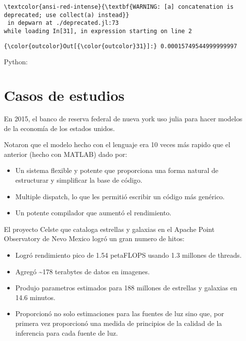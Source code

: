 \documentclass[11pt]{article}
\begin{document}
    \begin{Verbatim}[commandchars=\\\{\}]
\textcolor{ansi-red-intense}{\textbf{WARNING: [a] concatenation is deprecated; use collect(a) instead}}
 in depwarn at ./deprecated.jl:73
while loading In[31], in expression starting on line 2

    \end{Verbatim}

\begin{Verbatim}[commandchars=\\\{\}]
{\color{outcolor}Out[{\color{outcolor}31}]:} 0.00015749544999999997
\end{Verbatim}
            
    Python:

    \section{Casos de estudios}\label{casos-de-estudios}

    En 2015, el banco de reserva federal de nueva york uso julia para hacer
modelos de la economía de los estados unidos.

Notaron que el modelo hecho con el lenguaje era 10 veces más rapido que
el anterior (hecho con MATLAB) dado por:

\begin{itemize}
\item
  Un sistema flexible y potente que proporciona una forma natural de
  estructurar y simplificar la base de código.
\item
  Multiple dispatch, lo que les permitió escribir un código más
  genérico.
\item
  Un potente compilador que aumentó el rendimiento.
\end{itemize}

    El proyecto Celste que cataloga estrellas y galaxias en el Apache Point
Observatory de Nevo Mexico logró un gran numero de hitos:

\begin{itemize}
\item
  Logró rendimiento pico de 1.54 petaFLOPS usando 1.3 millones de
  threads.
\item
  Agregó \textasciitilde{}178 terabytes de datos en imagenes.
\item
  Produjo parametros estimados para 188 millones de estrellas y galaxias
  en 14.6 minutos.
\item
  Proporcionó no solo estimaciones para las fuentes de luz sino que, por
  primera vez proporcionó una medida de principios de la calidad de la
  inferencia para cada fuente de luz.
\end{itemize}
\end{document}
